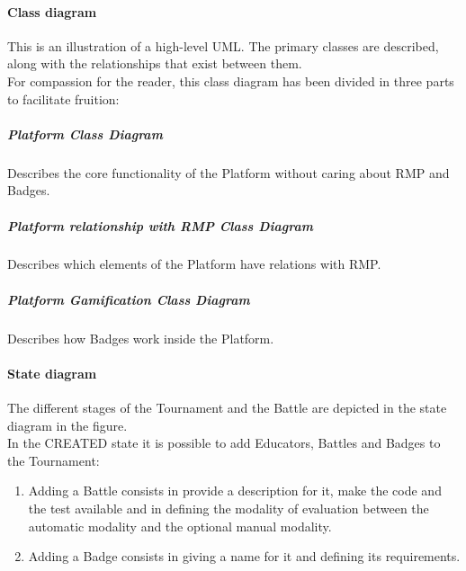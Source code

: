 \paragraph{Class diagram}
This is an illustration of a high-level UML. The primary classes are described, along with the relationships that exist between them.
\\For compassion for the reader, this class diagram has been divided in three parts to facilitate fruition:
\newpage
\subparagraph{Platform Class Diagram}
Describes the core functionality of the Platform without caring about RMP and Badges.\\
\newpage
\subparagraph{Platform relationship with RMP Class Diagram}
Describes which elements of the Platform have relations with RMP.\\
\newpage
\subparagraph{Platform Gamification Class Diagram}
Describes how Badges work inside the Platform.\\
\newpage 

\paragraph{State diagram}
The different stages of the Tournament and the Battle are depicted in the state diagram in the figure.
\\In the CREATED state it is possible to add Educators, Battles and Badges to the Tournament:
\begin{enumerate}[label=$\bullet$]
    \item Adding a Battle consists in provide a description for it, make the code and the test available and in defining the modality of evaluation between the automatic modality and the optional manual modality.
    \item Adding a Badge consists in giving a name for it and defining its requirements.
\end{enumerate}
\newpage

